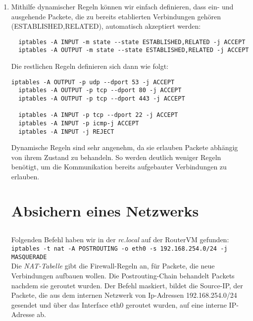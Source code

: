 \documentclass{scrartcl}
\begin{document}
\begin{enumerate}[\bfseries 1.]
	\item Mithilfe dynamischer Regeln können wir einfach definieren, dass ein- und
	      ausgehende Packete, die zu bereits etablierten Verbindungen gehören
	      (ESTABLISHED,RELATED), automatisch akzeptiert werden:
	      \begin{lstlisting}
  iptables -A INPUT -m state --state ESTABLISHED,RELATED -j ACCEPT
  iptables -A OUTPUT -m state --state ESTABLISHED,RELATED -j ACCEPT
	\end{lstlisting}
	Die restlichen Regeln definieren sich dann wie folgt:
	\begin{lstlisting}[]
  iptables -A OUTPUT -p udp --dport 53 -j ACCEPT
  iptables -A OUTPUT -p tcp --dport 80 -j ACCEPT
  iptables -A OUTPUT -p tcp --dport 443 -j ACCEPT

  iptables -A INPUT -p tcp --dport 22 -j ACCEPT
  iptables -A INPUT -p icmp-j ACCEPT
  iptables -A INPUT -j REJECT
	\end{lstlisting}
	Dynamische Regeln sind sehr angenehm, da sie erlauben Packete abhängig
	von ihrem Zustand zu behandeln. So werden deutlich weniger Regeln benötigt,
	um die Kommunikation bereits aufgebauter Verbindungen zu erlauben.

	\section{Absichern eines Netzwerks}
	\label{sec:Absichern eines Netzwerks}
	\subsection{}
	\label{sub:3.1}
	Folgenden Befehl haben wir in der \textit{rc.local} auf der RouterVM gefunden:\\
	\texttt{iptables -t nat -A POSTROUTING -o eth0 -s 192.168.254.0/24 -j MASQUERADE}\\
	Die \textit{NAT-Tabelle} gibt die Firewall-Regeln an, für Packete, die neue
	Verbindungen aufbauen wollen. Die Postrouting-Chain behandelt Packets nachdem
	sie geroutet wurden. Der Befehl maskiert, bildet die Source-IP, der Packete,
	die aus dem internen Netzwerk von Ip-Adressen 192.168.254.0/24 gesendet und
	über das Interface eth0 geroutet wurden, auf eine interne IP-Adresse ab.


\end{enumerate}
\end{document}
